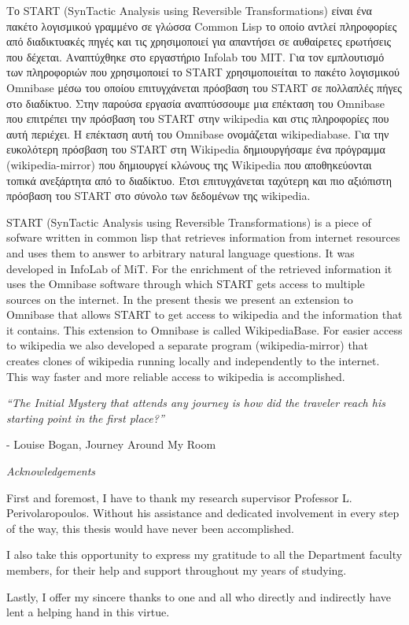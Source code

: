 Το START (SynTactic Analysis using Reversible Transformations) είναι
ένα πακέτο λογισμικού γραμμένο σε γλώσσα Common Lisp το οποίο αντλεί
πληροφορίες από διαδικτυακές πηγές και τις χρησιμοποιεί για
απαντήσει σε αυθαίρετες ερωτήσεις που δέχεται. Αναπτύχθηκε στο
εργαστήριο Infolab του MIT. Για τον εμπλουτισμό των πληροφοριών που
χρησιμοποιεί το START χρησιμοποιείται το πακέτο λογισμικού Omnibase
μέσω του οποίου επιτυγχάνεται πρόσβαση του START σε πολλαπλές πήγες
στο διαδίκτυο. Στην παρούσα εργασία αναπτύσσουμε μια επέκταση του
Omnibase που επιτρέπει την πρόσβαση του START στην wikipedia και
στις πληροφορίες που αυτή περιέχει. Η επέκταση αυτή του Omnibase
ονομάζεται wikipediabase.  Για την ευκολότερη πρόσβαση του START στη
Wikipedia δημιουργήσαμε ένα πρόγραμμα (wikipedia-mirror) που
δημιουργεί κλώνους της Wikipedia που αποθηκεύονται τοπικά ανεξάρτητα
από το διαδίκτυο.  Έτσι επιτυγχάνεται ταχύτερη και πιο αξιόπιστη
πρόσβαση του START στο σύνολο των δεδομένων της wikipedia.

START (SynTactic Analysis using Reversible Transformations) is a
piece of sofware written in common lisp that retrieves information
from internet resources and uses them to answer to arbitrary natural
language questions. It was developed in InfoLab of MiT. For the
enrichment of the retrieved information it uses the Omnibase
software through which START gets access to multiple sources on the
internet. In the present thesis we present an extension to Omnibase
that allows START to get access to wikipedia and the information
that it contains. This extension to Omnibase is called
WikipediaBase. For easier access to wikipedia we also developed a
separate program (wikipedia-mirror) that creates clones of wikipedia
running locally and independently to the internet. This way faster
and more reliable access to wikipedia is accomplished.

\vspace{3cm}
\begin{flushleft}
\textit{``The Initial Mystery that attends any journey is how did the traveler reach his starting point in the first place?''}
\end{flushleft}
\begin{flushright}
- Louise Bogan, Journey Around My Room
\end{flushright}
\afterpage{\blankpage}
\newpage


\thispagestyle{plain}
\vspace*{1in}
\begin{center}
\begin{Large}
\textit{Acknowledgements}
\end{Large}
\end{center}

First and foremost, I have to thank my research supervisor Professor L. Perivolaropoulos. Without his assistance and dedicated involvement in every step of the way, this thesis would have never been accomplished.

I also take this opportunity to express my gratitude to all the Department faculty members, for their help and support throughout my years of studying.

Lastly, I offer my sincere thanks to one and all who directly and indirectly have lent a helping hand in this virtue.
\afterpage{\blankpage}
\newpage
\tableofcontents
